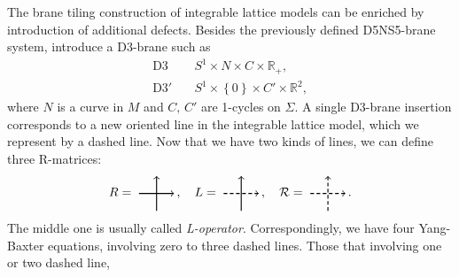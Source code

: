 The brane tiling construction of integrable lattice models can be
enriched by introduction of additional defects. Besides the previously
defined D5NS5-brane system, introduce a D3-brane such as 
\begin{align}
  \mathrm{D3}    &  \quad S^{1}  \times  N  \times  C  \times  \mathbb{R}_{+},\\
  \mathrm{D3'}   &  \quad S^{1}  \times\left\{ 0\right\}  \times  C'  \times  \mathbb{R}^{2},
\end{align}
 where $N$ is a curve in $M$ and $C,\,C'$ are 1-cycles on $\Sigma$.
A single D3-brane insertion corresponds to a new oriented line in
the integrable lattice model, which we represent by a dashed line.
Now that we have two kinds of lines, we can define three R-matrices:
\begin{equation}
  R=
    \begin{tikzpicture}[scale=0.5, baseline=(x.base)]
        \node (x) at (0,0) {\vphantom{x}};
        
        \draw[thick, ->] (0,0) -- (2,0);
        \draw[thick, ->] (1,-1) -- (1,1);
        
    \end{tikzpicture}
  \, ,
  \quad
  L=
    \begin{tikzpicture}[scale=0.5, baseline=(x.base)]
        \node (x) at (0,0) {\vphantom{x}};
        
        \draw[thick, densely dashed, ->] (0,0) -- (2,0);
        \draw[thick, ->] (1,-1) -- (1,1);
        
    \end{tikzpicture}
  \, ,
  \quad
  \mathcal{R}=
    \begin{tikzpicture}[scale=0.5, baseline=(x.base)]
        \node (x) at (0,0) {\vphantom{x}};
        
        \draw[thick, densely dashed, ->] (0,0) -- (2,0);
        \draw[thick, densely dashed, ->] (1,-1) -- (1,1);
        
    \end{tikzpicture}
  \, .
\end{equation}
 The middle one is usually called \emph{L-operator}. Correspondingly,
we have four Yang-Baxter equations, involving zero to three dashed
lines. Those that involving one or two dashed line, 
